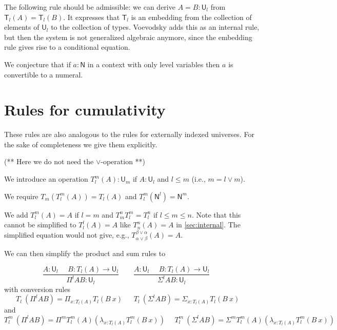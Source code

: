 \documentclass[11pt,a4paper]{article}
\newcommand{\Id}{\mathsf{Id}}
\def\NN{\mathsf{N}}
\def\UU{\mathsf{U}}
\def\Level{\mathsf{Level}}
\newcommand{\mypi}[3]{\Pi_{#1:#2}#3}
\newcommand{\mylam}[3]{\lambda_{#1:#2}#3}
\newcommand{\mysig}[3]{\Sigma_{#1:#2}#3}
\newcommand{\T}{\mathsf{T}}
\newcommand{\ua}{\mathsf{ua}}
\newcommand{\UA}{\mathsf{UA}}
\begin{document}
%
%
%
%
%
%
%

The following rule should be admissible:
we can derive $A = B : \UU_l$ from $\T_l(A) = \T_l(B)$.
 It expresses that $\T_l$ is an embedding from the collection of elements of $\UU_l$
 to the collection of types.
 Voevodsky \cite[Rule 20 on p. 17]{VV} adds this as an internal rule, but then the system is not
 generalized algebraic anymore, since the embedding rule gives rise to a conditional equation.

We conjecture that if $a : \NN$ in a context with only level variables
then $a$ is convertible to a numeral.


\section*{Rules for cumulativity} 

These rules are also analogous to the rules for externally indexed universes.
For the sake of completeness we give them explicitly.

(** Here we do not need the $\vee$-operation **)

We introduce an operation $T_{l}^{m}(A):\UU_{m}$ if $A:\UU_{l}$
and $l\leqslant m$ (i.e., $m = l\vee m$).

We require $T_{m}(T_{l}^{m}(A)) = T_{l}(A)$
and $T_{l}^{m}(\NN^{l}) = \NN^{m}$.

We add $T_{l}^m(A) = A$ if $l = m$
and $T_{m}^nT_{l}^m = T_l^n$ if $l\leqslant m\leqslant n$.
Note that this cannot be simplified to $T_{l}^l(A) = A$
like $T_{n}^n(A) = A$ in \cref{sec:internal}. 
The simplified equation would not give, e.g., 
$T_{\alpha\vee\beta}^{\beta\vee\alpha}(A) = A$.

We can then simplify the product and sum rules to

$$
\frac{A:\UU_{l}~~~~~~B:T_{l}(A)\rightarrow \UU_{l}}
     {\Pi^{l} A B:\UU_{l}}~~~~~~~~~
\frac{A:\UU_{l}~~~~~~B:T_{l}(A)\rightarrow \UU_{l}}
     {\Sigma^{l} A B:\UU_{l}}~~~~~~~~~
$$
with conversion rules
$$
T_{l}~(\Pi^{l} A B) = \mypi{x}{T_{l}(A)}{ T_{l}(B~x)}~~~~~~~
T_{l}~(\Sigma^{l} A B) =  \mysig{x}{T_{l}(A)}{ T_{l}(B~x)}~~~~~~~
$$
and
$$
T_{l}^{m}~(\Pi^{l} A B) = \Pi^{m} T_{l}^{m}(A) (\mylam {x}{T_{l}(A)}{T_{l}^{m}(B~x)})~~~~~~
T_{l}^{m}~(\Sigma^{l} A B) = \Sigma^{m} T_{l}^{m}(A) (\mylam {x}{T_{l}(A)}{T_{l}^{m}(B~x)})~~~~~~
$$
\end{document}
